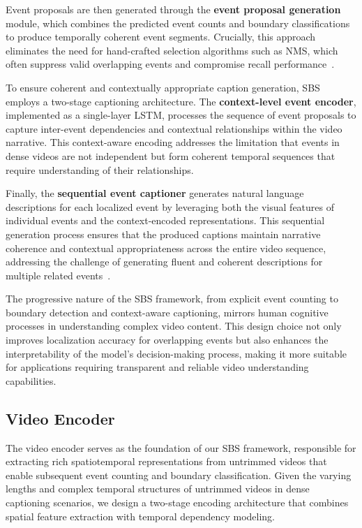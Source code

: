 Event proposals are then generated through the \textbf{event proposal generation} module, which combines the predicted event counts and boundary classifications to produce temporally coherent event segments.
Crucially, this approach eliminates the need for hand-crafted selection algorithms such as NMS, which often suppress valid overlapping events and compromise recall performance~\cite{hosang2017learning}.

To ensure coherent and contextually appropriate caption generation, SBS employs a two-stage captioning architecture.
The \textbf{context-level event encoder}, implemented as a single-layer LSTM, processes the sequence of event proposals to capture inter-event dependencies and contextual relationships within the video narrative.
This context-aware encoding addresses the limitation that events in dense videos are not independent but form coherent temporal sequences that require understanding of their relationships.

Finally, the \textbf{sequential event captioner} generates natural language descriptions for each localized event by leveraging both the visual features of individual events and the context-encoded representations.
This sequential generation process ensures that the produced captions maintain narrative coherence and contextual appropriateness across the entire video sequence, addressing the challenge of generating fluent and coherent descriptions for multiple related events~\cite{Yu2016-il,Lei2020-tg}.

The progressive nature of the SBS framework, from explicit event counting to boundary detection and context-aware captioning, mirrors human cognitive processes in understanding complex video content.
This design choice not only improves localization accuracy for overlapping events but also enhances the interpretability of the model's decision-making process, making it more suitable for applications requiring transparent and reliable video understanding capabilities.

\subsection{Video Encoder}
\label{subsec:method_video_encoder}

The video encoder serves as the foundation of our SBS framework, responsible for extracting rich spatiotemporal representations from untrimmed videos that enable subsequent event counting and boundary classification. Given the varying lengths and complex temporal structures of untrimmed videos in dense captioning scenarios, we design a two-stage encoding architecture that combines spatial feature extraction with temporal dependency modeling.

